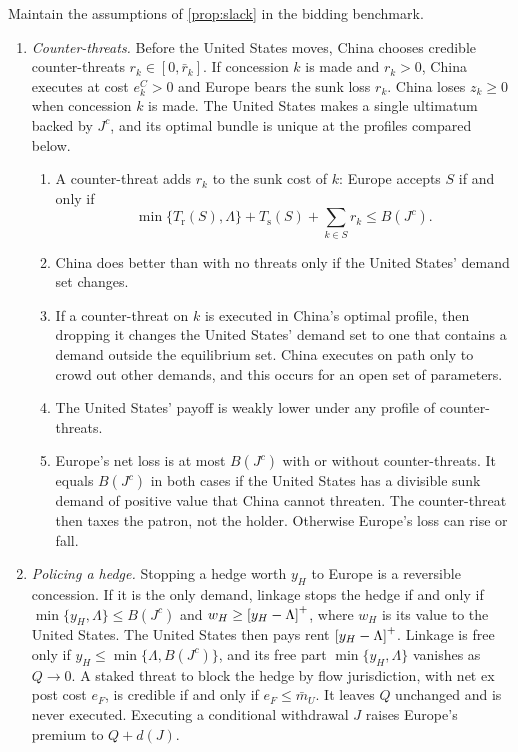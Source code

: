 \begin{proposition}\label{prop:counter}
Maintain the assumptions of \cref{prop:slack} in the bidding benchmark.
\begin{enumerate}[label=(\alph*)]
\item \emph{Counter-threats.} Before the United States moves, China chooses credible counter-threats $r_k\in[0,\bar r_k]$. If concession $k$ is made and $r_k>0$, China executes at cost $e^C_k>0$ and Europe bears the sunk loss $r_k$. China loses $z_k\ge 0$ when concession $k$ is made. The United States makes a single ultimatum backed by $J^c$, and its optimal bundle is unique at the profiles compared below.
  \begin{enumerate}[label=(\roman*)]
  \item A counter-threat adds $r_k$ to the sunk cost of $k$: Europe accepts $S$ if and only if
  \[ \min\{T_{\mathrm r}(S),\Lambda\}+T_{\mathrm s}(S)+\textstyle\sum_{k\in S}r_k\le B(J^c). \]
  \item China does better than with no threats only if the United States' demand set changes.
  \item If a counter-threat on $k$ is executed in China's optimal profile, then dropping it changes the United States' demand set to one that contains a demand outside the equilibrium set. China executes on path only to crowd out other demands, and this occurs for an open set of parameters.
  \item The United States' payoff is weakly lower under any profile of counter-threats.
  \item Europe's net loss is at most $B(J^c)$ with or without counter-threats. It equals $B(J^c)$ in both cases if the United States has a divisible sunk demand of positive value that China cannot threaten. The counter-threat then taxes the patron, not the holder. Otherwise Europe's loss can rise or fall.
  \end{enumerate}
\item \emph{Policing a hedge.} Stopping a hedge worth $y_H$ to Europe is a reversible concession. If it is the only demand, linkage stops the hedge if and only if $\min\{y_H,\Lambda\}\le B(J^c)$ and $w_H\ge\left[y_H-\Lambda\right]^{+}$, where $w_H$ is its value to the United States. The United States then pays rent $\left[y_H-\Lambda\right]^{+}$. Linkage is free only if $y_H\le\min\{\Lambda,B(J^c)\}$, and its free part $\min\{y_H,\Lambda\}$ vanishes as $Q\to 0$. A staked threat to block the hedge by flow jurisdiction, with net ex post cost $e_F$, is credible if and only if $e_F\le\bar m_U$. It leaves $Q$ unchanged and is never executed. Executing a conditional withdrawal $J$ raises Europe's premium to $Q+d(J)$.
\end{enumerate}
\end{proposition}


